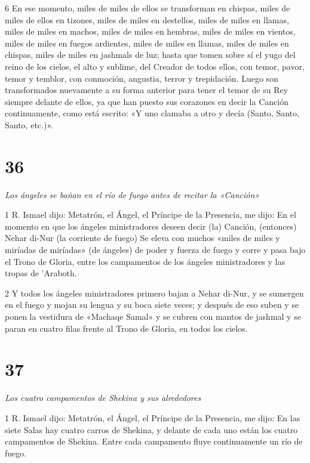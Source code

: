 \par 6 En ese momento, miles de miles de ellos se transforman en chispas, miles de miles de ellos en tizones, miles de miles en destellos, miles de miles en llamas, miles de miles en machos, miles de miles en hembras, miles de miles en vientos, miles de miles en fuegos ardientes, miles de miles en llamas, miles de miles en chispas, miles de miles en jashmals de luz; hasta que tomen sobre sí el yugo del reino de los cielos, el alto y sublime, del Creador de todos ellos, con temor, pavor, temor y temblor, con conmoción, angustia, terror y trepidación. Luego son transformados nuevamente a su forma anterior para tener el temor de su Rey siempre delante de ellos, ya que han puesto sus corazones en decir la Canción continuamente, como está escrito: «Y uno clamaba a otro y decía (Santo, Santo, Santo, etc.)».


\chapter{36}

\par \textit{Los ángeles se bañan en el río de fuego antes de recitar la «Canción»}

\par 1 R. Ismael dijo: Metatrón, el Ángel, el Príncipe de la Presencia, me dijo: En el momento en que los ángeles ministradores deseen decir (la) Canción, (entonces) Nehar di-Nur (la corriente de fuego) Se eleva con muchos «miles de miles y miríadas de miríadas» (de ángeles) de poder y fuerza de fuego y corre y pasa bajo el Trono de Gloria, entre los campamentos de los ángeles ministradores y las tropas de 'Araboth.

\par 2 Y todos los ángeles ministradores primero bajan a Nehar di-Nur, y se sumergen en el fuego y mojan su lengua y su boca siete veces; y después de eso suben y se ponen la vestidura de «Machaqe Samal» y se cubren con mantos de jashmal y se paran en cuatro filas frente al Trono de Gloria, en todos los cielos.


\chapter{37}

\par \textit{Los cuatro campamentos de Shekina y sus alrededores}

\par 1 R. Ismael dijo: Metatrón, el Ángel, el Príncipe de la Presencia, me dijo: En las siete Salas hay cuatro carros de Shekina, y delante de cada uno están los cuatro campamentos de Shekina. Entre cada campamento fluye continuamente un río de fuego.


